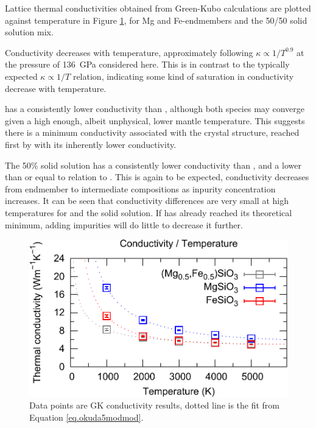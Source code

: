 Lattice thermal conductivities obtained from Green-Kubo calculations are plotted against temperature in Figure \ref{fig:kappa-temp_01}, for Mg and Fe-endmembers and the 50/50 solid solution mix.

Conductivity decreases with temperature, approximately following $\kappa \propto 1/T^{0.9}$ at the pressure of 136~GPa considered here. This is in contrast to the typically expected $\kappa \propto 1/T$ relation, indicating some kind of saturation in conductivity decrease with temperature.

\fesios has a consistently lower conductivity than \mgsio, although both species may converge given a high enough, albeit unphysical, lower mantle temperature. This suggests there is a minimum conductivity associated with the crystal structure, reached first by \fesios with its inherently lower conductivity.

The 50\% solid solution has a consistently lower conductivity than \mgsio, and a lower than or equal to relation to \fesios. This is again to be expected, conductivity decreases from endmember to intermediate compositions as inpurity concentration increases. It can be seen that conductivity differences are very small at high temperatures for \fesios and the solid solution. If \fesios has already reached its theoretical minimum, adding impurities will do little to decrease it further.

\begin{figure}[h!]
  \includegraphics[width=\linewidth]{Figures/k-t_all_02.png}
  \caption{Data points are GK conductivity results, dotted line is the fit from Equation \ref{eq.okuda5modmod}.}
  \label{fig:kappa-temp_01}
\end{figure}

